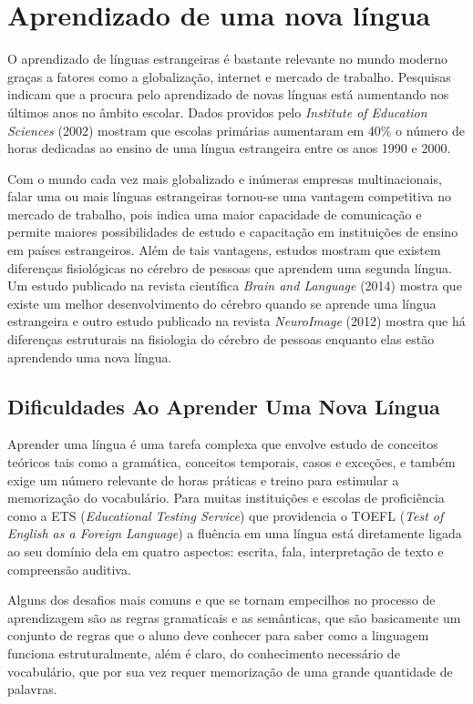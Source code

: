 \chapter{Aprendizado de uma nova língua}
\label{chap:cap2}
O aprendizado de línguas estrangeiras é bastante relevante no mundo moderno graças a fatores como a globalização, internet e mercado de trabalho. Pesquisas indicam que a procura pelo aprendizado de novas línguas está aumentando nos últimos anos no âmbito escolar. Dados providos pelo \textit{Institute of Education Sciences} (2002) mostram que escolas primárias aumentaram em 40\% o número de horas dedicadas ao ensino de uma língua estrangeira entre os anos 1990 e 2000. 

Com o mundo cada vez mais globalizado e inúmeras empresas multinacionais, falar uma ou mais línguas estrangeiras tornou-se uma vantagem competitiva no mercado de trabalho, pois indica uma maior capacidade de comunicação e permite maiores possibilidades de estudo e capacitação em instituições de ensino em países estrangeiros. Além de tais vantagens, estudos mostram que existem diferenças fisiológicas no cérebro de pessoas que aprendem uma segunda língua. Um estudo publicado na revista científica \textit{Brain and Language} (2014) mostra que existe um melhor desenvolvimento do cérebro quando se aprende uma língua estrangeira e outro estudo publicado na revista \textit{NeuroImage} (2012) mostra que há diferenças estruturais na fisiologia do cérebro de pessoas enquanto elas estão aprendendo uma nova língua.


\section{Dificuldades Ao Aprender Uma Nova Língua}
\label{sec:dificuldades}
Aprender uma língua é uma tarefa complexa que envolve estudo de conceitos teóricos tais como a gramática, conceitos temporais, casos e exceções, e também exige um número relevante de horas práticas e treino para estimular a memorização do vocabulário. Para muitas instituições e escolas de proficiência como a ETS (\textit{Educational Testing Service}) que providencia o TOEFL (\textit{Test of English as a Foreign Language}) a fluência em uma língua está diretamente ligada ao seu domínio dela em quatro aspectos: escrita, fala, interpretação de texto e compreensão auditiva.

Alguns dos desafios mais comuns e que se tornam empecilhos no processo de aprendizagem são as regras gramaticais e as semânticas, que são basicamente um conjunto de regras que o aluno deve conhecer para saber como a linguagem funciona estruturalmente, além é claro, do conhecimento necessário de vocabulário, que por sua vez requer memorização de uma grande quantidade de palavras.

